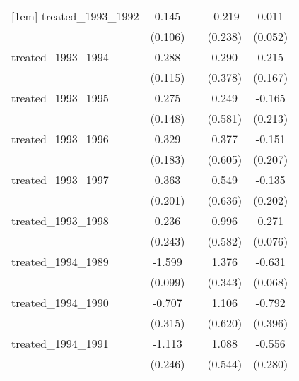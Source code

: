 {\begin{tabular}{l*{4}{c}}
[1em]
treated\_1993\_1992&       0.145         &                     &      -0.219         &       0.011         \\
            &     (0.106)         &                     &     (0.238)         &     (0.052)         \\
[1em]
treated\_1993\_1994&       0.288\sym{*}  &                     &       0.290         &       0.215         \\
            &     (0.115)         &                     &     (0.378)         &     (0.167)         \\
[1em]
treated\_1993\_1995&       0.275         &                     &       0.249         &      -0.165         \\
            &     (0.148)         &                     &     (0.581)         &     (0.213)         \\
[1em]
treated\_1993\_1996&       0.329         &                     &       0.377         &      -0.151         \\
            &     (0.183)         &                     &     (0.605)         &     (0.207)         \\
[1em]
treated\_1993\_1997&       0.363         &                     &       0.549         &      -0.135         \\
            &     (0.201)         &                     &     (0.636)         &     (0.202)         \\
[1em]
treated\_1993\_1998&       0.236         &                     &       0.996         &       0.271\sym{***}\\
            &     (0.243)         &                     &     (0.582)         &     (0.076)         \\
[1em]
treated\_1994\_1989&      -1.599\sym{***}&                     &       1.376\sym{***}&      -0.631\sym{***}\\
            &     (0.099)         &                     &     (0.343)         &     (0.068)         \\
[1em]
treated\_1994\_1990&      -0.707\sym{*}  &                     &       1.106         &      -0.792\sym{*}  \\
            &     (0.315)         &                     &     (0.620)         &     (0.396)         \\
[1em]
treated\_1994\_1991&      -1.113\sym{***}&                     &       1.088\sym{*}  &      -0.556\sym{*}  \\
            &     (0.246)         &                     &     (0.544)         &     (0.280)         \\

\end{tabular}}
